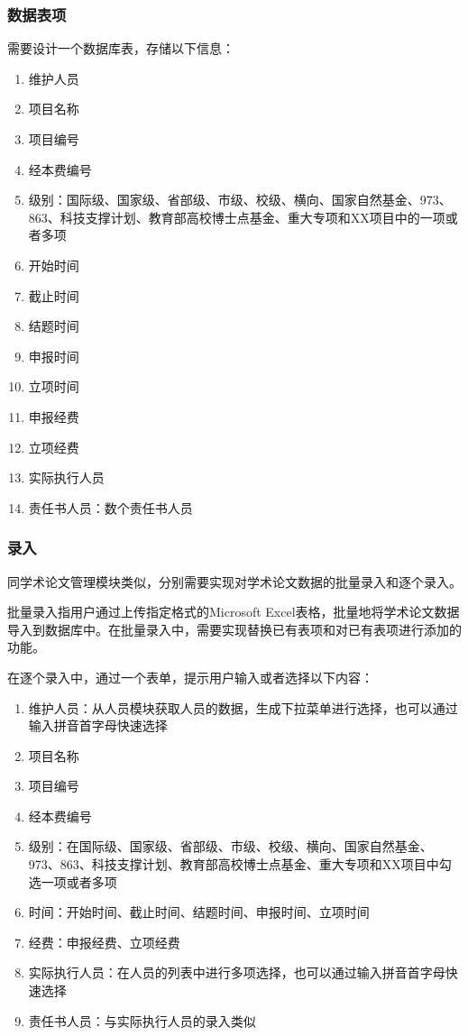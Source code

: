 \subsubsection{数据表项}

需要设计一个数据库表，存储以下信息：

\begin{enumerate}
\item 维护人员
\item 项目名称
\item 项目编号
\item 经本费编号
\item 级别：国际级、国家级、省部级、市级、校级、横向、国家自然基金、973、863、科技支撑计划、教育部高校博士点基金、重大专项和XX项目中的一项或者多项
\item 开始时间
\item 截止时间
\item 结题时间
\item 申报时间
\item 立项时间
\item 申报经费
\item 立项经费
\item 实际执行人员
\item 责任书人员：数个责任书人员
\end{enumerate}

\subsubsection{录入}
\label{projectcreate}
同学术论文管理模块类似，分别需要实现对学术论文数据的批量录入和逐个录入。

批量录入指用户通过上传指定格式的Microsoft Excel表格，批量地将学术论文数据导入到数据库中。在批量录入中，需要实现替换已有表项和对已有表项进行添加的功能。

在逐个录入中，通过一个表单，提示用户输入或者选择以下内容：

\begin{enumerate}
\item 维护人员：从人员模块获取人员的数据，生成下拉菜单进行选择，也可以通过输入拼音首字母快速选择
\item 项目名称
\item 项目编号
\item 经本费编号


\item 级别：在国际级、国家级、省部级、市级、校级、横向、国家自然基金、973、863、科技支撑计划、教育部高校博士点基金、重大专项和XX项目中勾选一项或者多项
\item 时间：开始时间、截止时间、结题时间、申报时间、立项时间
\item 经费：申报经费、立项经费
\item 实际执行人员：在人员的列表中进行多项选择，也可以通过输入拼音首字母快速选择
\item 责任书人员：与实际执行人员的录入类似
\end{enumerate}

